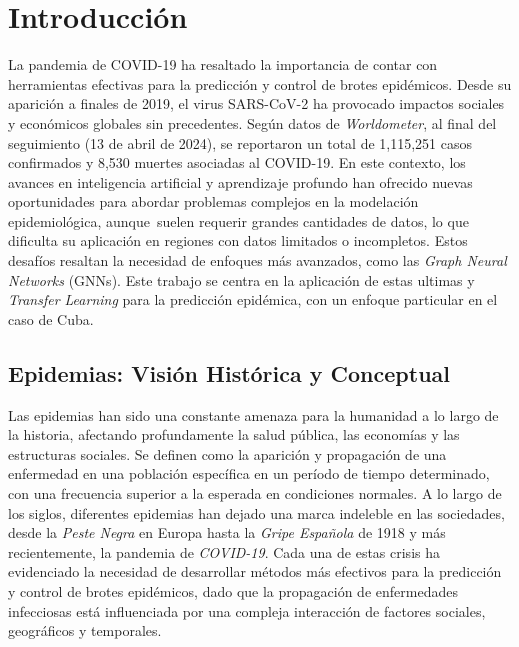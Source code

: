 \chapter*{Introducción}\label{chapter\:introduction}



La pandemia de COVID-19 ha resaltado la importancia de contar con herramientas efectivas para la predicción y control de brotes epidémicos. Desde su aparición a finales de 2019, el virus SARS-CoV-2 ha provocado impactos sociales y económicos globales sin precedentes. Según datos de \textit{Worldometer}, al final del seguimiento (13 de abril de 2024), se reportaron un total de 1,115,251 casos confirmados y 8,530 muertes asociadas al COVID-19. En este contexto, los avances en inteligencia artificial y aprendizaje profundo han ofrecido nuevas oportunidades para abordar problemas complejos en la modelación epidemiológica, aunque suelen requerir grandes cantidades de datos, lo que dificulta su aplicación en regiones con datos limitados o incompletos. Estos desafíos resaltan la necesidad de enfoques más avanzados, como las \textit{Graph Neural Networks} (GNNs). Este trabajo se centra en la aplicación de estas ultimas y \textit{Transfer Learning} para la predicción epidémica, con un enfoque particular en el caso de Cuba.


\section*{Epidemias: Visión Histórica y Conceptual}


Las epidemias han sido una constante amenaza para la humanidad a lo largo de la historia, afectando profundamente la salud pública, las economías y las estructuras sociales. Se definen como la aparición y propagación de una enfermedad en una población específica en un período de tiempo determinado, con una frecuencia superior a la esperada en condiciones normales. A lo largo de los siglos, diferentes epidemias han dejado una marca indeleble en las sociedades, desde la \textit{Peste Negra} en Europa hasta la \textit{Gripe Española} de 1918 y más recientemente, la pandemia de \textit{COVID-19}. Cada una de estas crisis ha evidenciado la necesidad de desarrollar métodos más efectivos para la predicción y control de brotes epidémicos, dado que la propagación de enfermedades infecciosas está influenciada por una compleja interacción de factores sociales, geográficos y temporales.


